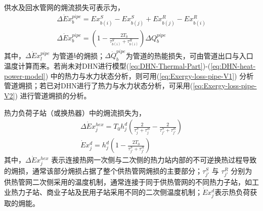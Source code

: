 供水及回水管网的㶲流损失可表示为，
\begin{subequations}
\label{eq:Exergy-loss-pipe}
\begin{gather}
\Delta \dot Ex_b^{pipe} = Ex_{b(i)}^S - Ex_{b(j)}^S + Ex_{b(j)}^R - Ex_{b(i)}^R \label{eq:Exergy-loss-pipe-V1}\\
\Delta \dot Ex_b^{pipe} = ({1 - \frac{{2{T_0}}}{{\tau_{b(i)}^S + \tau_{b(i)}^R}}})\Delta Q_b^{pipe} \label{eq:Exergy-loss-pipe-V2}
\end{gather}
\end{subequations}
其中，$\Delta \dot Ex_l^{pipe}$ 为管道$b$的㶲损；$\Delta \dot Q_b^{pipe}$为管道的热能损失，可由管道出口与入口温度计算而来。若尚未对DHN进行模型(\ref{eq:DHN-Thermal-Part})-(\ref{eq:DHN-heat-power-model}) 中的热力与水力状态分析，则可用(\ref{eq:Exergy-loss-pipe-V1}) 分析管道㶲损；若已对DHN进行了热力与水力状态分析，可采用(\ref{eq:Exergy-loss-pipe-V2}) 进行管道㶲损的分析。

热力负荷子站（或换热器）中的㶲流损失为，
\begin{subequations}
\label{eq:Exergy-loss-heat-exchanger}
\begin{gather}
\Delta \dot Ex_j^{hex} = {T_0}h_j^d({\frac{2}{{\tau_j^S + \tau_j^R}} - \frac{2}{{\tau_{j'}^S + \tau_{j'}^R}}})\\
\dot Ex_j^d = h_j^d({1 - \frac{{2{T_0}}}{{\tau_{j'}^S + \tau_{j'}^R}}})
\end{gather}
\end{subequations}
其中，$\Delta \dot Ex_j^{hex}$ 表示连接热网一次侧与二次侧的热力站内部的不可逆换热过程导致的㶲损，通常该部分㶲损占据了整个供热管网㶲损的主要部分；$\tau_{j'}^S$ 与 $\tau_{j'}^R$ 分别为供热管网二次侧采用的温度机制，通常连接于同于供热管网的不同热力子站，如工业热力子站、商业子站及民用子站采用不同的二次侧温度机制；$\dot Ex_j^d$表示热负荷获取的㶲能。

%

